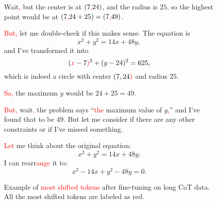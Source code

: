 \begin{figure*}[htbp]
\begin{tcolorbox}[title=Example of \textcolor{red}{most shifted tokens} after fine-tuning on long CoT data. (1/2), promptstyle]
Wait\textcolor{red}{,} but the center is at \((7\textcolor{red}{,} 24)\), and the radius is \(25\)\textcolor{red}{,} so the highest point would be at \((7\textcolor{red}{,} 24 + 25) = (7\textcolor{red}{,} 49)\).

\textcolor{red}{But}\textcolor{red}{,} let me double-check if this makes sense\textcolor{red}{.} The equation is 
\[
x^2 + y^2 = 14x + 48y,
\]
and I've transformed it into 
\[
(\textcolor{red}{x} - 7\textcolor{red}{)}^2 + (y - 24)^2 = 625,
\]
which is indeed a circle with center \((7, 24\textcolor{red}{)}\) and radius \(25\).

\textcolor{red}{So}\textcolor{red}{,} the maximum \(y\) would be \(24 + 25 = 49\).

\textcolor{red}{But}\textcolor{red}{,} wait\textcolor{red}{,} the problem says ``\textcolor{red}{the} maximum value of \(y\)\textcolor{red}{,}'' and I've found that to be \(49\)\textcolor{red}{.} But let me consider if there are any other constraints or if I've missed something.

\textcolor{red}{Let} me think about the original equation:
\[
x^2 + y^2 = 14x + 48y.
\]
I can rearr\textcolor{red}{ange} it to:
\[
x^2 - 14x + y^2 - 48y = 0.
\]

\end{tcolorbox}
\caption{Example of \textcolor{red}{most shifted tokens} after fine-tuning on long CoT data. All the most shifted tokens are labeled as red.}
    \label{fig: most_shifted_1}
\end{figure*}



